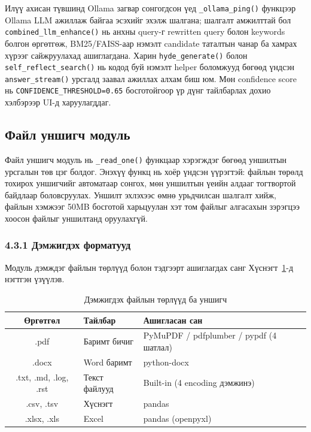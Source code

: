 \documentclass[11pt,a4paper]{article}
\begin{document}
Илүү ахисан түвшинд Ollama загвар сонгогдсон үед \texttt{\_ollama\_ping()} функцээр Ollama LLM ажиллаж байгаа эсэхийг эхэлж шалгана; шалгалт амжилттай бол \texttt{combined\_llm\_enhance()} нь анхны query-г rewritten query болон keywords болгон өргөтгөж, BM25/FAISS-аар нэмэлт candidate таталтын чанар ба хамрах хүрээг сайжруулахад ашиглагдана. Харин \texttt{hyde\_generate()} болон \texttt{self\_reflect\_search()} нь кодод буй нэмэлт helper боломжууд бөгөөд үндсэн \texttt{answer\_stream()} урсгалд заавал ажиллах алхам биш юм. Мөн confidence score нь \texttt{CONFIDENCE\_THRESHOLD=0.65} босготойгоор үр дүнг тайлбарлах дохио хэлбэрээр UI-д харуулагддаг.

\subsection{Файл уншигч модуль}

Файл уншигч модуль нь \texttt{\_read\_one()} функцаар хэрэгждэг бөгөөд уншилтын урсгалын төв цэг болдог. Энэхүү функц нь хоёр үндсэн үүрэгтэй: файлын төрөлд тохирох уншигчийг автоматаар сонгох, мөн уншилтын үеийн алдааг тогтвортой байдлаар боловсруулах. Уншилт эхлэхээс өмнө урьдчилсан шалгалт хийж, файлын хэмжээг 50MB босготой харьцуулан хэт том файлыг алгасахын зэрэгцээ хоосон файлыг уншилтанд оруулахгүй.

\subsubsection*{4.3.1 Дэмжигдэх форматууд}

Модуль дэмждэг файлын төрлүүд болон тэдгээрт ашиглагдах санг Хүснэгт~\ref{tab:file_extensions}-д нэгтгэн үзүүлэв.

\begin{table}[H]
\centering
\caption{Дэмжигдэх файлын төрлүүд ба уншигч}
\label{tab:file_extensions}
\begin{tabular}{|c|l|l|}
\hline
\textbf{Өргөтгөл} & \textbf{Тайлбар} & \textbf{Ашигласан сан} \\
\hline
.pdf  & Баримт бичиг   & PyMuPDF / pdfplumber / pypdf (4 шатлал) \\
.docx & Word баримт    & python-docx \\
.txt, .md, .log, .rst & Текст файлууд & Built-in (4 encoding дэмжинэ) \\
.csv, .tsv & Хүснэгт   & pandas \\
.xlsx, .xls & Excel    & pandas (openpyxl) \\
\hline
\end{tabular}
\end{table}
\end{document}
